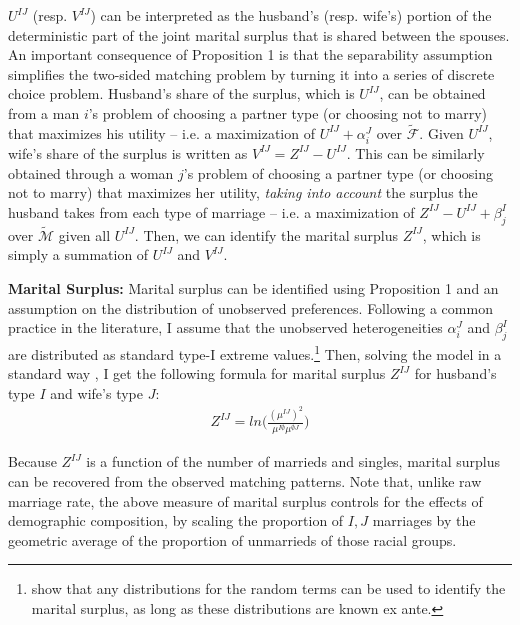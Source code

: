 \vspace{2mm} 
 $U^{IJ}$ (resp. $V^{IJ}$) can be interpreted as the husband's (resp. wife's) portion of the deterministic part of the joint marital surplus that is shared between the spouses.  An important consequence of Proposition 1 is that the separability assumption simplifies the two-sided matching problem by turning it into a series of discrete choice problem. Husband's share of the surplus, which is $U^{IJ}$, can be obtained from a man $i$'s problem of choosing a partner type (or choosing not to marry) that maximizes his utility -- i.e. a maximization of $U^{IJ} + \alpha^J_i$ over $\tilde{\mathcal{F}}$. Given $U^{IJ}$, wife's share of the surplus is written as $V^{IJ}=Z^{IJ} -U^{IJ}$. This can be similarly obtained through a woman $j$'s problem of choosing a partner type (or choosing not to marry) that maximizes her utility, \textit{taking into account} the surplus the husband takes from each type of marriage -- i.e. a maximization of $Z^{IJ} - U^{IJ} + \beta^I_j$ over $\tilde{\mathcal{M}}$ given all $U^{IJ}$. Then, we can identify the marital surplus $Z^{IJ}$, which is simply a summation of $U^{IJ}$ and $V^{IJ}$. 

 \vspace{4mm}
 \noindent \textbf{Marital Surplus:} Marital surplus can be identified using Proposition 1 and an assumption on the distribution of unobserved preferences. Following a common practice in the literature, I assume that the unobserved heterogeneities $\alpha^J_i$ and $\beta^I_j$ are distributed as standard type-I extreme values.\footnote{\cite{GalichonSalanie_2022_CupidInvisibleHand} show that any distributions for the random terms can be used to identify the marital surplus, as long as these distributions are known ex ante.} Then, solving the model in a standard way \citep{ChooSiow_2006_WhoMarriesWhomandWhy}, I get the following formula for marital surplus $Z^{IJ}$ for husband's type $I$ and wife's type $J$:
\begin{align} 
Z^{IJ} = ln \Big(\frac{(\mu^{IJ})^2}{\mu^{I\emptyset}\mu^{\emptyset J}}\Big) \label{eq:ZIJ}
\end{align}

 Because $Z^{IJ}$ is a function of the number of marrieds and singles, marital surplus can be recovered from the observed matching patterns. Note that, unlike raw marriage rate, the above measure of marital surplus controls for the effects of demographic composition, by scaling the proportion of $I, J$ marriages by the geometric average of the proportion of unmarrieds of those racial groups. 
 
